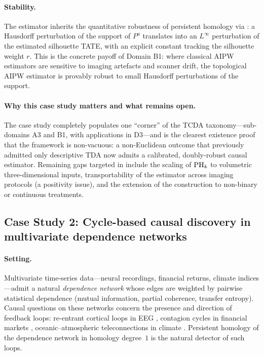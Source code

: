 \paragraph{Stability.}
The estimator inherits the quantitative robustness of persistent
homology via : a Hausdorff perturbation
of the support of $P^a$ translates into an $L^\infty$ perturbation of
the estimated silhouette TATE, with an explicit constant tracking the
silhouette weight $r$. This is the concrete payoff of Domain B1:
where classical AIPW estimators are sensitive to imaging artefacts and
scanner drift, the topological AIPW estimator is provably robust to
small Hausdorff perturbations of the support.

\paragraph{Why this case study matters and what remains open.}
The case study completely populates one ``corner'' of the TCDA
taxonomy---sub-domains A3 and B1, with applications in D3---and is the
clearest existence proof that the framework is non-vacuous: a
non-Euclidean outcome that previously admitted only descriptive TDA
now admits a calibrated, doubly-robust causal estimator. Remaining
gaps targeted in  include the scaling of
$\mathrm{PH}_{k}$ to volumetric three-dimensional inputs, transportability of
the estimator across imaging protocols (a positivity issue), and the
extension of the construction to non-binary or continuous treatments.

\subsection{Case Study 2: Cycle-based causal discovery in
multivariate dependence networks}\label{sec:cs_cycles}

\paragraph{Setting.}
Multivariate time-series data---neural recordings, financial returns,
climate indices---admit a natural \emph{dependence network} whose edges
are weighted by pairwise statistical dependence (mutual information,
partial coherence, transfer entropy). Causal questions on these
networks concern the presence and direction of feedback loops:
re-entrant cortical loops in EEG \citep{sizemore2018cliques,
elyaagoubi2023statistical}, contagion cycles in financial markets
\citep{gidea2018topological,ismail2022early}, oceanic--atmospheric
teleconnections in climate \citep{strommen2025topological}. Persistent
homology of the dependence network in homology degree~$1$ is the
natural detector of such loops.


